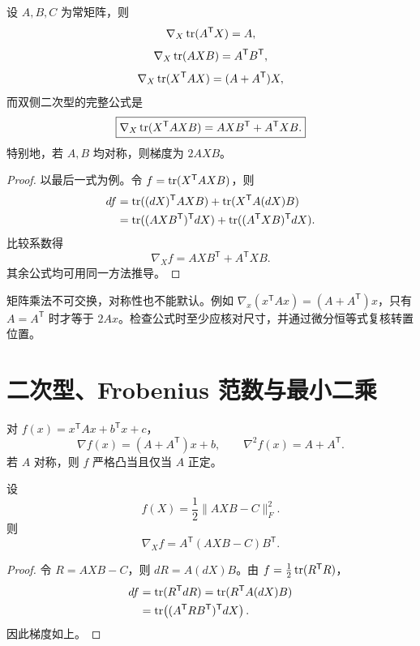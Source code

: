 \begin{theorem}[常用矩阵梯度]
设 $A,B,C$ 为常矩阵，则
\[
\nabla_X\operatorname{tr}(A^{\mathsf T}X)=A,
\]
\[
\nabla_X\operatorname{tr}(AXB)=A^{\mathsf T}B^{\mathsf T},
\]
\[
\nabla_X\operatorname{tr}(X^{\mathsf T}AX)=(A+A^{\mathsf T})X,
\]
而双侧二次型的完整公式是
\[
\boxed{\nabla_X\operatorname{tr}(X^{\mathsf T}AXB)=AXB^{\mathsf T}+A^{\mathsf T}XB.}
\]
特别地，若 $A,B$ 均对称，则梯度为 $2AXB$。
\end{theorem}
\begin{proof}
以最后一式为例。令 $f=\operatorname{tr}(X^{\mathsf T}AXB)$，则
\begin{align*}
df
&=\operatorname{tr}((dX)^{\mathsf T}AXB)+\operatorname{tr}(X^{\mathsf T}A(dX)B)\\
&=\operatorname{tr}((AXB^{\mathsf T})^{\mathsf T}dX)
 +\operatorname{tr}((A^{\mathsf T}XB)^{\mathsf T}dX).
\end{align*}
比较系数得
\[
\nabla_Xf=AXB^{\mathsf T}+A^{\mathsf T}XB.
\]
其余公式均可用同一方法推导。
\end{proof}

\begin{pitfall}[不要直接套用未经验证的公式]
矩阵乘法不可交换，对称性也不能默认。例如
$\nabla_x(x^{\mathsf T}Ax)=(A+A^{\mathsf T})x$，只有 $A=A^{\mathsf T}$ 时才等于 $2Ax$。检查公式时至少应核对尺寸，并通过微分恒等式复核转置位置。
\end{pitfall}

\section{二次型、Frobenius 范数与最小二乘}

\begin{proposition}[向量二次型]
对 $f(x)=x^{\mathsf T}Ax+b^{\mathsf T}x+c$，
\[
\nabla f(x)=(A+A^{\mathsf T})x+b,
\qquad
\nabla^2f(x)=A+A^{\mathsf T}.
\]
若 $A$ 对称，则 $f$ 严格凸当且仅当 $A$ 正定。
\end{proposition}

\begin{theorem}
设
\[
f(X)=\frac12\lVert AXB-C\rVert_F^2.
\]
则
\[
\nabla_Xf=A^{\mathsf T}(AXB-C)B^{\mathsf T}.
\]
\end{theorem}
\begin{proof}
令 $R=AXB-C$，则 $dR=A(dX)B$。由
$f=\frac12\operatorname{tr}(R^{\mathsf T}R)$，
\begin{align*}
df
&=\operatorname{tr}(R^{\mathsf T}dR)
=\operatorname{tr}(R^{\mathsf T}A(dX)B)\\
&=\operatorname{tr}\!\left((A^{\mathsf T}RB^{\mathsf T})^{\mathsf T}dX\right).
\end{align*}
因此梯度如上。
\end{proof}

